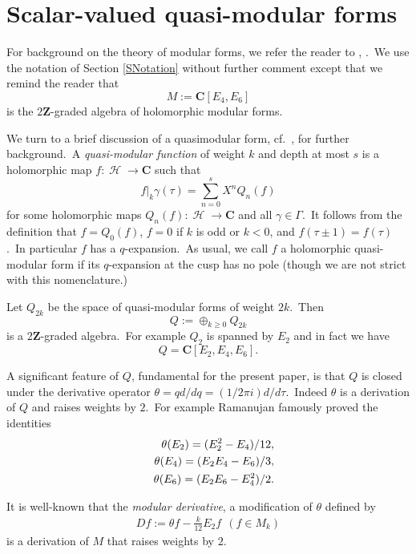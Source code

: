\documentclass[12pt]{amsart}
\theoremstyle{plain}
\theoremstyle{definition}
\theoremstyle{remark}
\DeclareMathOperator{\uhp}{\mathcal{H}}
\newcommand{\CC}{\mathbf{C}}
\newcommand{\ZZ}{\mathbf{Z}}
\begin{document}
\appendix
\section{Scalar-valued quasi-modular forms}\label{AppA}

For background on the theory of modular forms, we refer the reader to \cite{Zagier123}, \cite{DiamondShurman}.\ We use the notation of 
Section \ref{SNotation} without further comment except that we remind the reader that
$$M:=\CC[E_4, E_6]$$
is the $2\ZZ$-graded algebra of holomorphic modular forms. 

\medskip
We turn to a brief discussion of a quasimodular form, cf.\ \cite{RoyerQuasi}, \cite{Zagier123} for further background.\ A \emph{quasi-modular function} of weight $k$ and depth at most $s$ is a holomorphic map
$f\colon \uhp \to \CC$
 such that 
 \[
   f|_k\gamma(\tau)=\sum_{n=0}^s X^nQ_n(f)
 \]
 for some holomorphic maps $Q_n(f) \colon \uhp \to \CC$ and all $\gamma\in\Gamma$.\ It follows from the definition that $f=Q_0(f)$,
 $f=0$ if $k$ is odd or $k<0$, and $f(\tau\pm 1)=f(\tau)$.\ In particular $f$ has a $q$-expansion.\ As usual, we call $f$ a  holomorphic quasi-modular form if its $q$-expansion at the cusp has no pole (though we are not strict with this nomenclature.)

\medskip
Let $Q_{2k}$ be the space of quasi-modular forms of weight $2k$.\ Then 
$$Q:=\oplus_{k\geq0} Q_{2k}$$
is a $2\ZZ$-graded algebra.\ For example $Q_2$ is spanned by $E_2$ and in fact we have
    \[
    Q = \CC[E_2,E_4,E_6].
    \]

A significant feature of $Q$, fundamental for the present paper, is that $Q$ is closed under the derivative operator
$\theta=qd/dq=(1/2\pi i)d/d\tau$.\ Indeed $\theta$ is a derivation of $Q$ and raises weights by $2$.\ For example
Ramanujan famously proved the identities
\begin{eqnarray}
  &&  \theta (E_{2}) = (E_2^2-E_4)/12,\notag\\
   && \theta (E_{4}) = (E_2E_4-E_6)/3, \label{Ramanujanids}\\
   && \theta (E_{6}) = (E_2E_6-E_4^2)/2. \notag
\end{eqnarray}

It is well-known that the \emph{modular derivative}, a modification of $\theta$
defined by
\begin{align*}
    D f :=\theta f - \frac{k}{12} E_{2} f
    \ \ (f\in M_{k})
\end{align*}
is a derivation of $M$ that raises weights by $2$.
\end{document}
